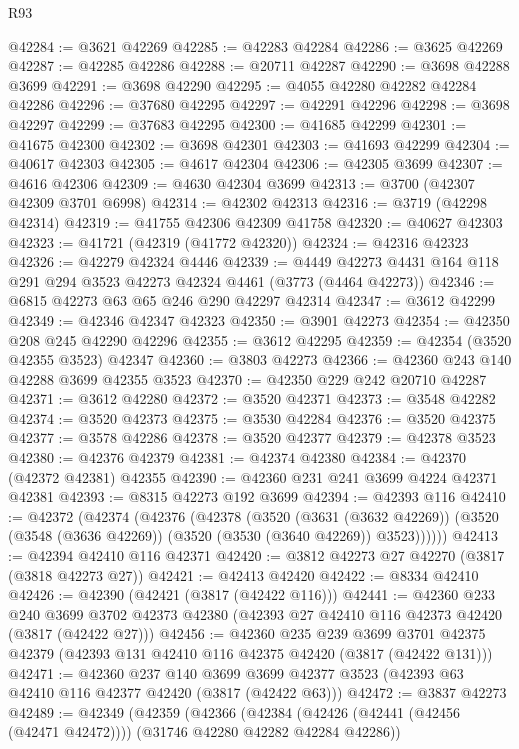 \begin{lexlean}{R93}
\begin{coremodule}
@42284 := @3621 @42269
@42285 := @42283 @42284
@42286 := @3625 @42269
@42287 := @42285 @42286
@42288 := @20711 @42287
@42290 := @3698 @42288 @3699
@42291 := @3698 @42290
@42295 := @4055 @42280 @42282 @42284 @42286
@42296 := @37680 @42295
@42297 := @42291 @42296
@42298 := @3698 @42297
@42299 := @37683 @42295
@42300 := @41685 @42299
@42301 := @41675 @42300
@42302 := @3698 @42301
@42303 := @41693 @42299
@42304 := @40617 @42303
@42305 := @4617 @42304
@42306 := @42305 @3699
@42307 := @4616 @42306
@42309 := @4630 @42304 @3699
@42313 := @3700 (@42307 @42309 @3701 @6998)
@42314 := @42302 @42313
@42316 := @3719 (@42298 @42314)
@42319 := @41755 @42306 @42309 @41758
@42320 := @40627 @42303
@42323 := @41721 (@42319 (@41772 @42320))
@42324 := @42316 @42323
@42326 := @42279 @42324 @4446
@42339 := @4449 @42273 @4431 @164 @118 @291 @294 @3523 @42273 @42324 @4461 (@3773 (@4464 @42273))
@42346 := @6815 @42273 @63 @65 @246 @290 @42297 @42314
@42347 := @3612 @42299
@42349 := @42346 @42347 @42323
@42350 := @3901 @42273
@42354 := @42350 @208 @245 @42290 @42296
@42355 := @3612 @42295
@42359 := @42354 (@3520 @42355 @3523) @42347
@42360 := @3803 @42273
@42366 := @42360 @243 @140 @42288 @3699 @42355 @3523
@42370 := @42350 @229 @242 @20710 @42287
@42371 := @3612 @42280
@42372 := @3520 @42371
@42373 := @3548 @42282
@42374 := @3520 @42373
@42375 := @3530 @42284
@42376 := @3520 @42375
@42377 := @3578 @42286
@42378 := @3520 @42377
@42379 := @42378 @3523
@42380 := @42376 @42379
@42381 := @42374 @42380
@42384 := @42370 (@42372 @42381) @42355
@42390 := @42360 @231 @241 @3699 @4224 @42371 @42381
@42393 := @8315 @42273 @192 @3699
@42394 := @42393 @116
@42410 := @42372
    (@42374
      (@42376
        (@42378
          (@3520
            (@3631 (@3632 @42269))
            (@3520 (@3548 (@3636 @42269)) (@3520 (@3530 (@3640 @42269)) @3523))))))
@42413 := @42394 @42410 @116 @42371
@42420 := @3812 @42273 @27 @42270 (@3817 (@3818 @42273 @27))
@42421 := @42413 @42420
@42422 := @8334 @42410
@42426 := @42390 (@42421 (@3817 (@42422 @116)))
@42441 := @42360
    @233
    @240
    @3699
    @3702
    @42373
    @42380
    (@42393 @27 @42410 @116 @42373 @42420 (@3817 (@42422 @27)))
@42456 := @42360
    @235
    @239
    @3699
    @3701
    @42375
    @42379
    (@42393 @131 @42410 @116 @42375 @42420 (@3817 (@42422 @131)))
@42471 := @42360
    @237
    @140
    @3699
    @3699
    @42377
    @3523
    (@42393 @63 @42410 @116 @42377 @42420 (@3817 (@42422 @63)))
@42472 := @3837 @42273
@42489 := @42349
    (@42359
      (@42366
        (@42384 (@42426 (@42441 (@42456 (@42471 @42472)))) (@31746 @42280 @42282 @42284 @42286))

\end{coremodule}
\end{lexlean}
